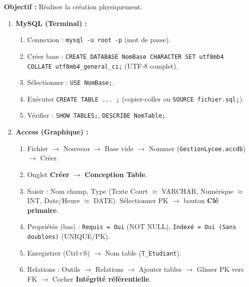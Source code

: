 \documentclass[11pt]{article}
\begin{document}
\begin{methode}
\textbf{Objectif :} Réaliser la création physiquement.
\begin{enumerate}
    \item \textbf{MySQL (Terminal) :}
    \begin{enumerate}
        \item Connexion : \texttt{mysql -u root -p} (mot de passe).
        \item Créer base : \texttt{CREATE DATABASE NomBase CHARACTER SET utf8mb4 COLLATE utf8mb4\_general\_ci;} (UTF-8 complet).
        \item Sélectionner : \texttt{USE NomBase;}.
        \item Exécuter \texttt{CREATE TABLE ... ;} (copier-coller ou \texttt{SOURCE fichier.sql;}).
        \item Vérifier : \texttt{SHOW TABLES;}, \texttt{DESCRIBE NomTable;}.
    \end{enumerate}
    \item \textbf{Access (Graphique) :}
    \begin{enumerate}
        \item Fichier $\rightarrow$ Nouveau $\rightarrow$ Base vide $\rightarrow$ Nommer (\texttt{GestionLycee.accdb}) $\rightarrow$ Créer.
        \item Onglet \textbf{Créer} $\rightarrow$ \textbf{Conception Table}.
        \item Saisir : Nom champ, Type (Texte Court $\approx$ VARCHAR, Numérique $\approx$ INT, Date/Heure $\approx$ DATE). Sélectionner PK $\rightarrow$ bouton \textbf{Clé primaire}.
        \item Propriétés (bas) : \texttt{Requis = Oui} (NOT NULL), \texttt{Indexé = Oui (Sans doublons)} (UNIQUE/PK).
        \item Enregistrer (Ctrl+S) $\rightarrow$ Nom table (\texttt{T\_Etudiant}).
        \item Relations : Outils $\rightarrow$ Relations $\rightarrow$ Ajouter tables $\rightarrow$ Glisser PK vers FK $\rightarrow$ Cocher \textbf{Intégrité référentielle}.
    \end{enumerate}
\end{enumerate}
\end{methode}
\end{document}
